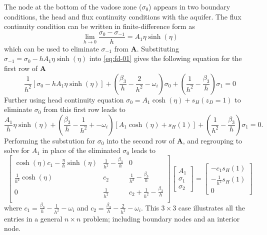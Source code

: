 \documentclass[12pt,letterpaper]{article}
\begin{document}
The node at the bottom of the vadose zone ($\sigma_0$) appears in two
boundary conditions, the head and flux continuity conditions with the
aquifer.  The flux continuity condition can be written in
finite-difference form as
\begin{equation}
 \nonumber
  \lim_{h \rightarrow 0} \frac{\sigma_0 - \sigma_{-1}}{h} = A_1 \eta \sinh(\eta)
\end{equation}
which can be used to eliminate $\sigma_{-1}$ from $\mathbf{A}$.
Substituting $\sigma_{-1} = \sigma_0 - hA_1 \eta \sinh(\eta)$ into
\eqref{eq:fd-01} gives the following equation for the first row of
$\mathbf{A}$
\begin{equation}
  \nonumber
  \frac{1}{h^2} \left[ \sigma_0 - hA_1 \eta \sinh(\eta)\right] +
  \left(\frac{\beta_3}{h} - \frac{2}{h^2}  - \omega_i\right) \sigma_0
  + \left(\frac{1}{h^2} - \frac{\beta_3}{h}\right) \sigma_1 = 0
\end{equation}
Further using head continuity equation $\sigma_0 = A_1 \cosh(\eta) +
s_{H}(z_D=1)$ to eliminate $\sigma_0$ from this first row leads to
\begin{equation}
 \nonumber
    \frac{A_1}{h}  \eta \sinh(\eta) +
  \left( \frac{\beta_3}{h} - \frac{1}{h^2} + - \omega_i\right) \left[
    A_1 \cosh(\eta) + s_{H}(1)\right] + \left(\frac{1}{h^2} -
    \frac{\beta_3}{h}\right) \sigma_1 = 0.
\end{equation}
Performing the substution for $\sigma_0$ into the second row of
$\mathbf{A}$, and regrouping to solve for $A_1$ in place of the
eliminated $\sigma_0$ leads to
 \begin{equation}
  \label{eq:fd-02}
  \left[ \begin{matrix}
     \cosh(\eta)c_1 - \frac{\eta}{h} \sinh(\eta) &
    \frac{1}{h^2} - \frac{\beta_3}{h} & 0 \\ 
     \frac{1}{h^2}\cosh(\eta) & c_2 &
    \frac{1}{h^2} - \frac{\beta_3}{h}   \\ 
     0 & \frac{1}{h^2} & c_2 +
    \frac{1}{h^2} - \frac{\beta_3}{h} \\ 
  \end{matrix}\right] 
\left[\begin{matrix}
A_1 \\ \sigma_1 \\ \sigma_2 
\end{matrix}\right]
=
\left[\begin{matrix}
-c_1 s_H(1) \\ 
-\frac{1}{h^2}s_H(1) \\ 0 
\end{matrix}\right]
\end{equation}
where $c_1 = \frac{\beta_3}{h} - \frac{1}{h^2} - \omega_i$ and $c_2 =
\frac{\beta_3}{h} - \frac{2}{h^2} - \omega_i $.  This 
$3\times 3$ case illustrates all the entries in a general $n\times
n$ problem; including boundary nodes and an interior node.  
\end{document}
